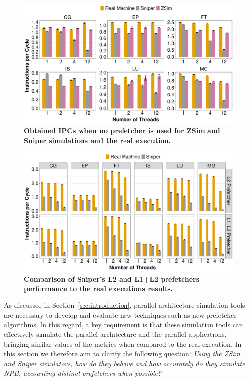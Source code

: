 \documentclass[AMA,final,STIX1COL]{WileyNJD-v2}
\newcommand\new[1]{{\color{red}\textbf{#1}}}
\begin{document}
\begin{figure}[!htb]
    \centering
    \includegraphics[width=\linewidth]{figures/ipc-no-prefetch-all.pdf}
    \caption{\new{Obtained IPCs when no prefetcher is used for ZSim and Sniper simulations and the real execution.}}
    \label{fig:sims_nopref}
\end{figure}

\begin{figure}[!htb]
    \centering
    \includegraphics[width=\linewidth]{figures/ipc-l1-l1-l2-all.pdf}
    \caption{\new{Comparison of Sniper's L2 and L1+L2 prefetchers performance to the real executions results.}}
    \label{fig:sniper_l2}
\end{figure}

As discussed in Section~\ref{sec:introduction}, parallel architecture simulation tools are necessary to develop and evaluate new techniques such as new prefetcher algorithms. In this regard, a key requirement is that these simulation tools can effectively simulate the parallel architecture and the parallel applications, bringing similar values of the metrics when compared to the real execution. In this section we therefore aim to clarify the following question: \textit{Using the ZSim and Sniper simulators, how do they behave and how accurately do they simulate NPB, accounting distinct prefetchers when possible?}
\end{document}
